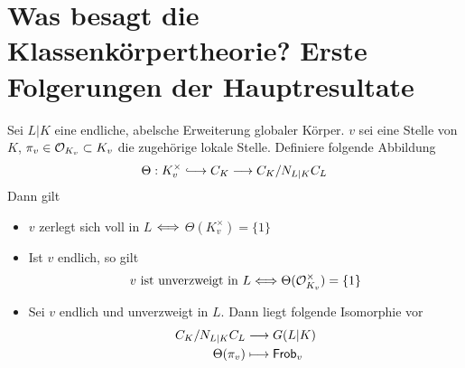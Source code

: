 \section{Was besagt die Klassenkörpertheorie? Erste Folgerungen der Hauptresultate}
\Satz{}
Sei $L|K$ eine endliche, abelsche Erweiterung globaler Körper. $v$ sei eine Stelle von $K$, $\pi_v \in \mathcal{O}_{K_v} \subset K_v$ die zugehörige lokale Stelle. Definiere folgende Abbildung
\[ \Theta : K_v^\times \Inj{} C_K \Pfeil{} C_K/N_{L|K}C_L \]
Dann gilt
\begin{itemize}
\item $v$ zerlegt sich voll in $L$ $\overset{}{\Longleftrightarrow}$ $\Theta(K_v^\times) = \{1\}$
\item Ist $v$ endlich, so gilt
\[ v \text{ ist unverzweigt in }L\overset{}{\Longleftrightarrow} \Theta(\mathcal{O}_{K_v}^\times) = \{1\} \]
\item Sei $v$ endlich und unverzweigt in $L$. Dann liegt folgende Isomorphie vor
\begin{align*}
C_K / N_{L|K}C_L &\overset{}{\longrightarrow} G(L|K)\\
\Theta(\pi_v) & \longmapsto \textsf{Frob}_v
\end{align*}
\end{itemize}